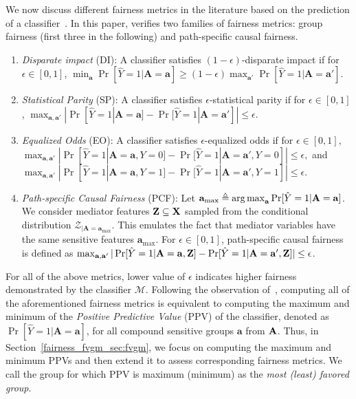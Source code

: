  	We now discuss different fairness metrics in the literature based on the prediction of a classifier~\cite{feldman2015certifying,hardt2016equality,nabi2018fair}.  	
 	In this paper, {\fvgm} verifies two families of fairness metrics: group fairness (first three in the following) and path-specific causal fairness.

 	\begin{enumerate}[leftmargin=*]
 		\itemsep0em 
 		\item \textit{Disparate impact} (DI): A classifier  satisfies $(1 - \epsilon)$-disparate impact if for $\epsilon \in [0,1] $,
 		$
 		\min_{\mathbf{a}} \Pr[\hat{Y} =1 | \mathbf{A} =  \mathbf{a}]  \ge (1 - \epsilon) \max_{\mathbf{a}'} \Pr[\hat{Y} =1 | \mathbf{A} =  \mathbf{a}'].
 		$
 		\item \textit{Statistical Parity} (SP): A classifier satisfies $\epsilon$-statistical parity if for $\epsilon \in [0,1] $, 
 		$
 		\max_{\mathbf{a}, \mathbf{a}'}|\Pr[\hat{Y} =1 | \mathbf{A} = \mathbf{a}] - \Pr [\hat{Y} = 1| \mathbf{A} = \mathbf{a}']| \le \epsilon.
 		$
 		\item \textit{Equalized Odds} (EO): 	A classifier satisfies $\epsilon$-equalized odds if for $\epsilon \in [0,1] $,
 		$ \max_{\mathbf{a}, \mathbf{a}'} |\Pr[\hat{Y} =1 |\mathbf{A}= \mathbf{a}, Y= 0  ] - \Pr [\hat{Y} = 1|\mathbf{A}= \mathbf{a}', Y = 0]| \le \epsilon, $ and $
 		\max_{\mathbf{a}, \mathbf{a}'}|\Pr[\hat{Y} =1 |\mathbf{A}= \mathbf{a}, Y= 1  ] - \Pr [\hat{Y} = 1|\mathbf{A}= \mathbf{a}', Y = 1]| \le \epsilon.
 		$
 		\item \textit{Path-specific Causal Fairness} (PCF): 
 		Let $ \mathbf{a}_{\max}  \triangleq \operatorname*{arg\,max}_{ \mathbf{a}} \Pr[\hat{Y} =1 |\mathbf{A}=  \mathbf{a}] $. We consider mediator features $ \mathbf{Z} \subseteq \mathbf{X} $ sampled from the conditional distribution $ {\mathcal{Z}_{|\mathbf{A} = \mathbf{a}_{\max}}} $. This emulates the fact that mediator variables have the same sensitive features $ \mathbf{a}_{\max} $.  For $ \epsilon \in [0,1] $,  path-specific causal fairness is defined as 
 		$
 		\max_{\mathbf{a}, \mathbf{a}'} |\Pr[\hat{Y} = 1 | \mathbf{A} =  \mathbf{a}, \mathbf{Z}] - \Pr[\hat{Y} = 1 | \mathbf{A} = \mathbf{a}', \mathbf{Z} ]| \le \epsilon
 		$.
 	\end{enumerate}

 	  For all of the above metrics, lower value of $\epsilon$ indicates higher fairness demonstrated by the classifier $\mathcal{M}$. Following the observation of~\cite{ghosh2020justicia},  computing all of the aforementioned fairness metrics is equivalent to computing the maximum and minimum of the \textit{Positive Predictive Value} (PPV) of the classifier, denoted as $\Pr[\hat{Y}=1|\mathbf{A} =\mathbf{a}]$, for all compound sensitive groups $\mathbf{a}$ from $ \mathbf{A} $. Thus, in Section~\ref{fairness_fvgm_sec:fvgm}, we focus on computing the maximum and minimum PPVs and then extend it to assess corresponding fairness metrics. We call the group for which PPV is maximum (minimum) as the \textit{most (least) favored group}.
 
